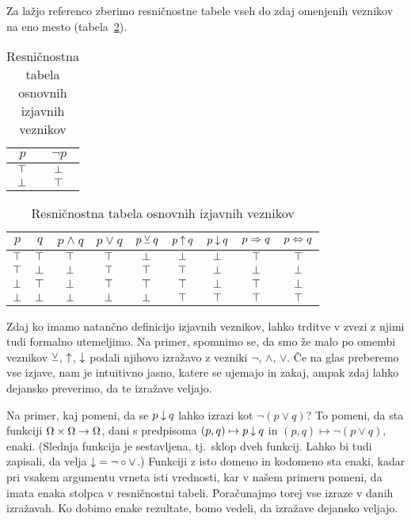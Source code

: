                 Za lažjo referenco zberimo resničnostne tabele vseh do zdaj omenjenih veznikov na eno mesto (tabela~\ref{tabela:resnicnostna-tabela-osnovnih-izjavnih-veznikov}).

                \begin{table}[!ht]
                        \centering
                        \begin{tabular}{c|c}
                                $p$ & $\lnot{p}$ \\
                                \hline
                                $\top$ & $\bot$ \\
                                $\bot$ & $\top$
                        \end{tabular}
                        \qquad\quad
                        \begin{tabular}{cc|ccccccc}
                                $p$ & $q$ & $p \land q$ & $p \lor q$ & $p \mathbin{\veebar} q$ & $p \mathbin{\uparrow} q$ & $p \mathbin{\downarrow} q$ & $p \Rightarrow q$ & $p \Leftrightarrow q$ \\
                                \hline
                                $\top$ & $\top$ & $\top$ & $\top$ & $\bot$ & $\bot$ & $\bot$ & $\top$ & $\top$ \\
                                $\top$ & $\bot$ & $\bot$ & $\top$ & $\top$ & $\top$ & $\bot$ & $\bot$ & $\bot$ \\
                                $\bot$ & $\top$ & $\bot$ & $\top$ & $\top$ & $\top$ & $\bot$ & $\top$ & $\bot$ \\
                                $\bot$ & $\bot$ & $\bot$ & $\bot$ & $\bot$ & $\top$ & $\top$ & $\top$ & $\top$
                        \end{tabular}
                        \caption{Resničnostna tabela osnovnih izjavnih veznikov}\label{tabela:resnicnostna-tabela-osnovnih-izjavnih-veznikov}
                \end{table}

                Zdaj ko imamo natančno definicijo izjavnih veznikov, lahko trditve v zvezi z njimi tudi formalno utemeljimo. Na primer, spomnimo se, da smo že malo po omembi veznikov $\mathbin{\veebar}$, $\mathbin{\uparrow}$, $\mathbin{\downarrow}$ podali njihovo izražavo z vezniki $\lnot$, $\land$, $\lor$. Če na glas preberemo vse izjave, nam je intuitivno jasno, katere se ujemajo in zakaj, ampak zdaj lahko dejansko preverimo, da te izražave veljajo.

                Na primer, kaj pomeni, da se $p \mathbin{\downarrow} q$ lahko izrazi kot $\lnot(p \lor q)$? To pomeni, da sta funkciji $\Omega \times \Omega \to \Omega$, dani s predpisoma $(p, q) \mapsto p \mathbin{\downarrow} q$ in $(p, q) \mapsto \lnot(p \lor q)$, enaki. (Slednja funkcija je sestavljena, tj.~sklop dveh funkcij. Lahko bi tudi zapisali, da velja $\mathbin{\downarrow} = \lnot \circ \lor$.) Funkciji z isto domeno in kodomeno sta enaki, kadar pri vsakem argumentu vrneta isti vrednosti, kar v našem primeru pomeni, da imata enaka stolpca v resničnostni tabeli. Poračunajmo torej vse izraze v danih izražavah. Ko dobimo enake rezultate, bomo vedeli, da izražave dejansko veljajo.

